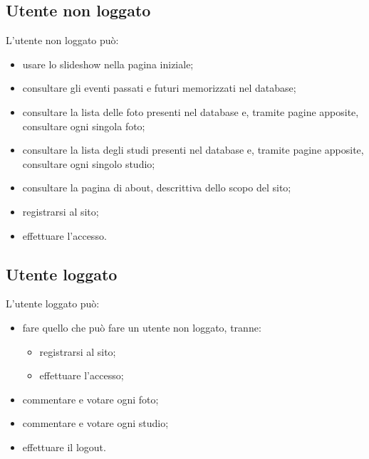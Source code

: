 	\subsection{Utente non loggato}
	L'utente non loggato può:
	\begin{itemize}
	\item usare lo slideshow nella pagina iniziale;
	\item consultare gli eventi passati e futuri memorizzati nel database;
	\item consultare la lista delle foto presenti nel database e, tramite pagine apposite, consultare ogni singola foto;
	\item consultare la lista degli studi presenti nel database e, tramite pagine apposite, consultare ogni singolo studio;
	\item consultare la pagina di about, descrittiva dello scopo del sito;
	\item registrarsi al sito;
	\item effettuare l'accesso.
	\end{itemize}
	\subsection{Utente loggato}
	L'utente loggato può:
	\begin{itemize}
	\item fare quello che può fare un utente non loggato, tranne:
	\begin{itemize}
	\item registrarsi al sito;
	\item effettuare l'accesso;
	\end{itemize}
	\item commentare e votare ogni foto;
	\item commentare e votare ogni studio;
	\item effettuare il logout.
	\end{itemize}
	

